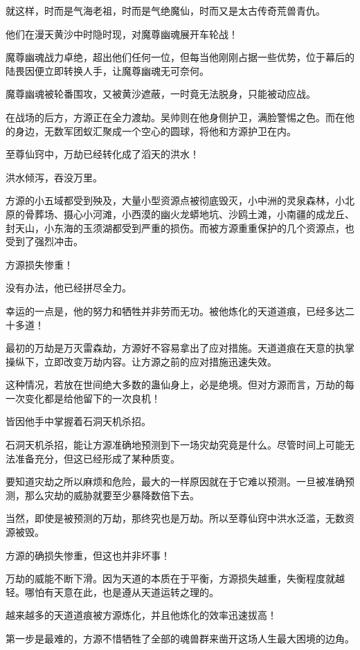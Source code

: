 \begin{this_body}
就这样，时而是气海老祖，时而是气绝魔仙，时而又是太古传奇荒兽青仇。

他们在漫天黄沙中时隐时现，对魔尊幽魂展开车轮战！

魔尊幽魂战力卓绝，超出他们任何一位，但每当他刚刚占据一些优势，位于幕后的陆畏因便立即转换人手，让魔尊幽魂无可奈何。

魔尊幽魂被轮番围攻，又被黄沙遮蔽，一时竟无法脱身，只能被动应战。

在战场的后方，方源正在全力渡劫。吴帅则在他身侧护卫，满脸警惕之色。而在他的身边，无数军团蚁汇聚成一个空心的圆球，将他和方源护卫在内。

至尊仙窍中，万劫已经转化成了滔天的洪水！

洪水倾泻，吞没万里。

方源的小五域都受到殃及，大量小型资源点被彻底毁灭，小中洲的灵泉森林，小北原的骨葬场、摄心小河滩，小西漠的幽火龙蟒地坑、沙鸥土滩，小南疆的成龙丘、封天山，小东海的玉须湖都受到严重的损伤。而被方源重重保护的几个资源点，也受到了强烈冲击。

方源损失惨重！

没有办法，他已经拼尽全力。

幸运的一点是，他的努力和牺牲并非劳而无功。被他炼化的天道道痕，已经多达二十多道！

最初的万劫是万灭雷森劫，方源好不容易拿出了应对措施。天道道痕在天意的执掌操纵下，立即改变万劫内容。让方源之前的应对措施迅速失效。

这种情况，若放在世间绝大多数的蛊仙身上，必是绝境。但对方源而言，万劫的每一次变化都是给他留下的一次良机！

皆因他手中掌握着石洞天机杀招。

石洞天机杀招，能让方源准确地预测到下一场灾劫究竟是什么。尽管时间上可能无法准备充分，但这已经形成了某种质变。

要知道灾劫之所以麻烦和危险，最大的一样原因就在于它难以预测。一旦被准确预测，那么灾劫的威胁就要至少暴降数倍下去。

当然，即使是被预测的万劫，那终究也是万劫。所以至尊仙窍中洪水泛滥，无数资源被毁。

方源的确损失惨重，但这也并非坏事！

万劫的威能不断下滑。因为天道的本质在于平衡，方源损失越重，失衡程度就越轻。哪怕有天意在此，也是遵从天道运转之理的。

越来越多的天道道痕被方源炼化，并且他炼化的效率迅速拔高！

第一步是最难的，方源不惜牺牲了全部的魂兽群来凿开这场人生最大困境的边角。


\end{this_body}
